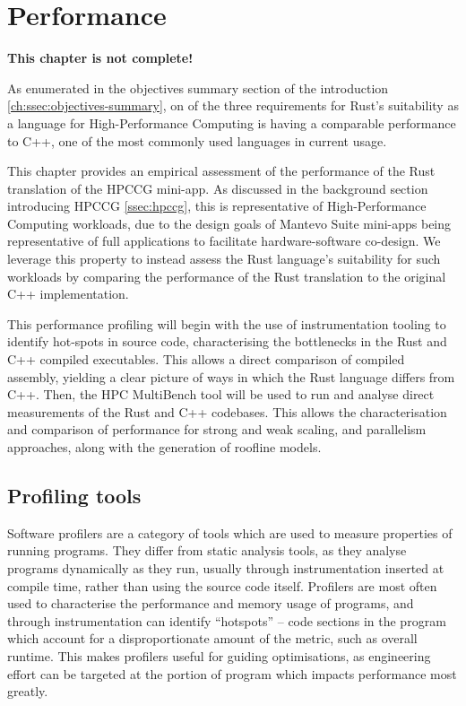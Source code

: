 \chapter{Performance}
\label{ch:performance} %

\textbf{This chapter is not complete!}

As enumerated in the objectives summary section of the introduction \ref{ch:ssec:objectives-summary}, on of the three requirements for Rust's suitability as a language for High-Performance Computing is having a comparable performance to C++, one of the most commonly used languages in current usage.

This chapter provides an empirical assessment of the performance of the Rust translation of the HPCCG mini-app. As discussed in the background section introducing HPCCG \ref{ssec:hpccg}, this is representative of High-Performance Computing workloads, due to the design goals of Mantevo Suite mini-apps being representative of full applications to facilitate hardware-software co-design. We leverage this property to instead assess the Rust language's suitability for such workloads by comparing the performance of the Rust translation to the original C++ implementation.

This performance profiling will begin with the use of instrumentation tooling to identify hot-spots in source code, characterising the bottlenecks in the Rust and C++ compiled executables. This allows a direct comparison of compiled assembly, yielding a clear picture of ways in which the Rust language differs from C++. Then, the HPC MultiBench tool will be used to run and analyse direct measurements of the Rust and C++ codebases. This allows the characterisation and comparison of performance for strong and weak scaling, and parallelism approaches, along with the generation of roofline models.

\section{Profiling tools}
\label{sec:profiling-tools} %

Software profilers are a category of tools which are used to measure properties of running programs. They differ from static analysis tools, as they analyse programs dynamically as they run, usually through instrumentation inserted at compile time, rather than using the source code itself. Profilers are most often used to characterise the performance and memory usage of programs, and through instrumentation can identify ``hotspots'' -- code sections in the program which account for a disproportionate amount of the metric, such as overall runtime. This makes profilers useful for guiding optimisations, as engineering effort can be targeted at the portion of program which impacts performance most greatly.

